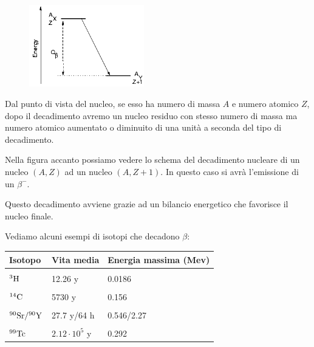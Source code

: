 \vspace{0.4cm}

\begin{minipage}{0.345\textwidth}
    \vspace{-0.6cm}
    \begin{figure}[H]
        \includegraphics[width=5cm]{immagini/Isotopi_beta.png}
    \end{figure}
\end{minipage}
\begin{minipage}{0.65\textwidth}
    Dal punto di vista del nucleo, se esso ha numero di massa $A$ e numero atomico $Z$, dopo il decadimento avremo un nucleo residuo con stesso numero di massa ma numero atomico aumentato o diminuito di una unità a seconda del tipo di decadimento.

    Nella figura accanto possiamo vedere lo schema del decadimento nucleare di un nucleo $(A,Z)$ ad un nucleo $(A,Z+1)$. In questo caso si avrà l'emissione di un $\beta^-$. %
\end{minipage}

\vspace{0.4cm}Questo decadimento avviene grazie ad un bilancio energetico che favorisce il nucleo finale.

Vediamo alcuni esempi di isotopi che decadono $\beta$:

\begin{center}
    \begin{tabular}{|l|l|l|}
        \hline
        Isotopo & Vita media & Energia massima (Mev)\\
        \hline
        &&\\[-0.45cm]
        $\rm ^3H$ & 12.26 y & 0.0186\\
        \hline
        &&\\[-0.45cm]
        $\rm ^{14}C$ & 5730 y & 0.156\\
        \hline
        &&\\[-0.45cm]
        $\rm ^{90}Sr / ^{90}Y$ & 27.7 y/64 h & 0.546/2.27\\
        \hline
        &&\\[-0.45cm]
        $\rm ^{99}Tc$ & $2.12 \cdot 10^5$ y & 0.292\\
        \hline
    \end{tabular}
\end{center}


